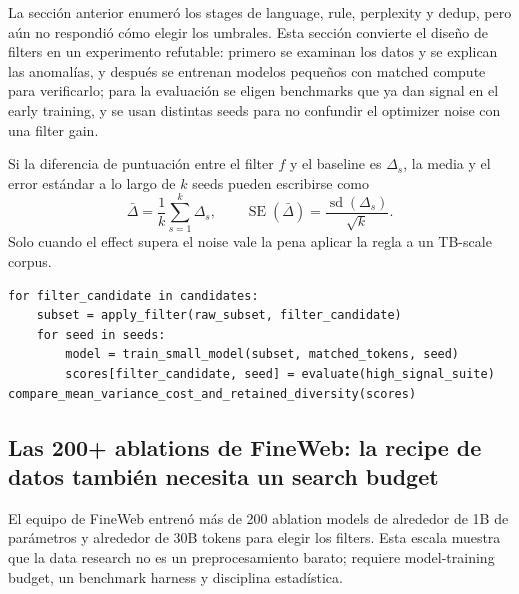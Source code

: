 La sección anterior enumeró los stages de language, rule, perplexity y dedup, pero aún no respondió cómo elegir los umbrales. Esta sección convierte el diseño de filters en un experimento refutable: primero se examinan los datos y se explican las anomalías, y después se entrenan modelos pequeños con matched compute para verificarlo; para la evaluación se eligen benchmarks que ya dan signal en el early training, y se usan distintas seeds para no confundir el optimizer noise con una filter gain.


Si la diferencia de puntuación entre el filter $f$ y el baseline es $\Delta_s$, la media y el error estándar a lo largo de $k$ seeds pueden escribirse como
\[
\bar\Delta=\frac{1}{k}\sum_{s=1}^{k}\Delta_s,
\qquad
\operatorname{SE}(\bar\Delta)=\frac{\operatorname{sd}(\Delta_s)}{\sqrt{k}}.
\]
Solo cuando el effect supera el noise vale la pena aplicar la regla a un TB-scale corpus.

\begin{lstlisting}[caption={Protocolo experimental mínimo de una ablation de filtrado de datos}]
for filter_candidate in candidates:
    subset = apply_filter(raw_subset, filter_candidate)
    for seed in seeds:
        model = train_small_model(subset, matched_tokens, seed)
        scores[filter_candidate, seed] = evaluate(high_signal_suite)
compare_mean_variance_cost_and_retained_diversity(scores)
\end{lstlisting}


\subsection{Las 200+ ablations de FineWeb: la recipe de datos también necesita un search budget}

El equipo de FineWeb entrenó más de 200 ablation models de alrededor de 1B de parámetros y alrededor de 30B tokens para elegir los filters. Esta escala muestra que la data research no es un preprocesamiento barato; requiere model-training budget, un benchmark harness y disciplina estadística.

